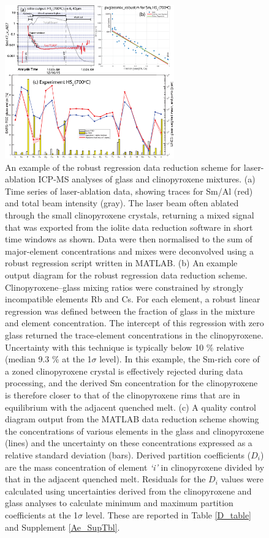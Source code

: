 \documentclass[review,authoryear,12pt]{elsarticle}
\begin{document}
\begin{figure}[]
\begin{center}
\includegraphics[width=0.65\textwidth]{S4_QAQC_LaserMix_H5_2}
\caption[An example of the robust regression data reduction scheme for laser-ablation ICP-MS analyses of glass and clinopyroxene mixtures.]
    {An example of the robust regression data reduction scheme for laser-ablation ICP-MS analyses of glass and clinopyroxene mixtures. (a) Time series of laser-ablation data, showing traces for Sm/Al (red) and total beam intensity (gray). The laser beam often ablated through the small clinopyroxene crystals, returning a mixed signal that was exported from the iolite data reduction software in short time windows as shown. Data were then normalised to the sum of major-element concentrations and mixes were deconvolved using a robust regression script written in MATLAB. (b) An example output diagram for the robust regression data reduction scheme. Clinopyroxene--glass mixing ratios were constrained by strongly incompatible elements Rb and Cs. For each element, a robust linear regression was defined between the fraction of glass in the mixture and element concentration. The intercept of this regression with zero glass returned the trace-element concentrations in the clinopyroxene. Uncertainty with this technique is typically below 10 \% relative (median 9.3 \% at the 1$\sigma$ level). In this example, the Sm-rich core of a zoned clinopyroxene crystal is effectively rejected during data processing, and the derived Sm concentration for the clinopyroxene is therefore closer to that of the clinopyroxene rims that are in equilibrium with the adjacent quenched melt. (c) A quality control diagram output from the MATLAB data reduction scheme showing the concentrations of various elements in the glass and clinopyroxene (lines) and the uncertainty on these concentrations expressed as a relative standard deviation (bars). Derived partition coefficients ($D_i$) are the mass concentration of element \emph{`i'} in clinopyroxene divided by that in the adjacent quenched melt. Residuals for the $D_i$ values were calculated using uncertainties derived from the clinopyroxene and glass analyses to calculate minimum and maximum partition coefficients at the 1$\sigma$ level. These are reported in Table \ref{D_table} and Supplement \ref{Ae_SupTbl}. %
}
\end{center}
\end{figure}
\end{document}
